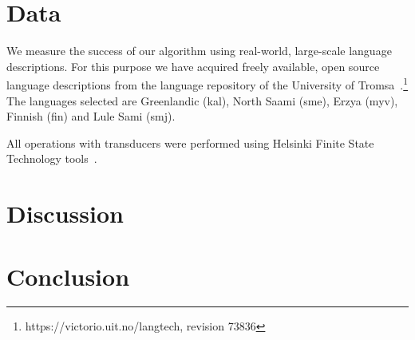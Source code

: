\documentclass[11pt]{article}
\begin{document}

\section{Data}
\label{sec:data}

We measure the success of our algorithm using real-world, large-scale
language descriptions. For this purpose we have acquired freely
available, open source language descriptions from the language repository of the University of 
Tromsa~\cite{moshagen2013building}.\footnote{https://victorio.uit.no/langtech, revision 73836} The
languages selected are Greenlandic (kal), North Saami (sme), Erzya
(myv), Finnish (fin) and Lule Sami (smj).

All operations with transducers were performed using Helsinki Finite
State Technology tools~\cite{linden2011}.



\section{Discussion}
\label{sec:discussion}





\section{Conclusion}
\label{sec:conclusion}



\iffalse
\section*{Acknowledgements}
The research leading to these results has received funding from FIN-CLARIN, Langnet and the
European Commission's 7th Framework Program under grant agreement n° 238405 (CLARA).
\fi



\end{document}
